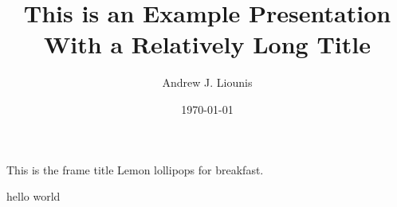 \documentclass{beamer}
\title{This is an Example Presentation With a Relatively Long Title}
\date{\today}
\author{Andrew J. Liounis}
\begin{document}
\begin{frame}
    \titlepage
\end{frame}

\begin{frame}{This is the frame title}
    Lemon lollipops for breakfast.
\end{frame}

\begin{frame}[plain]
    hello world
\end{frame}
\end{document}
